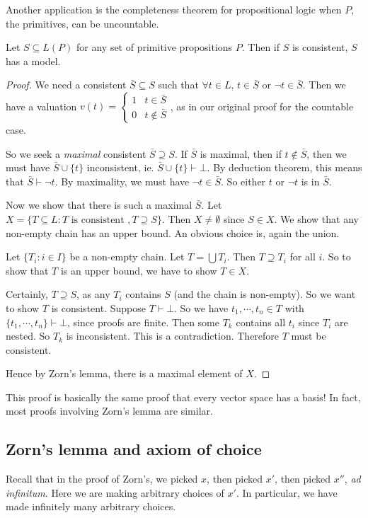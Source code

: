 \documentclass[a4paper]{article}
\begin{document}
Another application is the completeness theorem for propositional logic when $P$, the primitives, can be uncountable.

\begin{thm}
  Let $S\subseteq L(P)$ for any set of primitive propositions $P$. Then if $S$ is consistent, $S$ has a model.
\end{thm}

\begin{proof}
  We need a consistent $\bar S \subseteq S$ such that $\forall t\in L$, $t\in \bar S$ or $\neg t\in \bar S$. Then we have a valuation $v(t) = \begin{cases} 1 & t\in \bar S \\ 0 & t\not\in \bar S\end{cases}$, as in our original proof for the countable case.

  So we seek a \emph{maximal} consistent $\bar S\supseteq S$. If $\bar S$ is maximal, then if $t\not\in \bar S$, then we must have $\bar S \cup \{t\}$ inconsistent, ie. $\bar S \cup \{t\}\vdash \bot$. By deduction theorem, this means that $\bar S \vdash \neg t$. By maximality, we must have $\neg t \in \bar S$. So either $t$ or $\neg t$ is in $\bar S$.

  Now we show that there is such a maximal $\bar S$. Let $X = \{ T\subseteq L: T\text{ is consistent }, T\supseteq S\}$. Then $X\not=\emptyset$ since $S\in X$. We show that any non-empty chain has an upper bound. An obvious choice is, again the union.

  Let $\{T_i: i\in I\}$ be a non-empty chain. Let $T = \bigcup T_i$. Then $T\supseteq T_i$ for all $i$. So to show that $T$ is an upper bound, we have to show $T\in X$.

  Certainly, $T\supseteq S$, as any $T_i$ contains $S$ (and the chain is non-empty). So we want to show $T$ is consistent. Suppose $T\vdash \bot$. So we have $t_1, \cdots, t_n \in T$ with $\{t_1, \cdots, t_n\} \vdash \bot$, since proofs are finite. Then some $T_k$ contains all $t_i$ since $T_i$ are nested. So $T_k$ is inconsistent. This is a contradiction. Therefore $T$ must be consistent.

  Hence by Zorn's lemma, there is a maximal element of $X$.
\end{proof}
This proof is basically the same proof that every vector space has a basis! In fact, most proofs involving Zorn's lemma are similar.

\subsection{Zorn's lemma and axiom of choice}
Recall that in the proof of Zorn's, we picked $x$, then picked $x'$, then picked $x''$, \emph{ad infinitum}. Here we are making arbitrary choices of $x'$. In particular, we have made infinitely many arbitrary choices.
\end{document}
